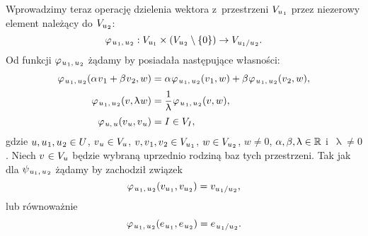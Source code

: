 \documentclass[a4paper,11pt]{article}
\numberwithin{equation}{section}
\renewcommand{\lambda}{\uplambda}
\begin{document}
Wprowadzimy teraz operację dzielenia wektora z~przestrzeni
$V_{ u_{ \hspace{0.05em} 1 } }$ przez niezerowy element należący do
$V_{ u_{ \hspace{0.05em} 2 } }$:
\begin{equation}
  \label{eq:Mechanika-Rozwazania-ogolne-15}
  \varphi_{ \hspace{0.07em} u_{ \hspace{0.05em} 1 }, \, u_{ \hspace{0.05em} 2 } } :
  V_{ u_{ 1 } } \times ( V_{ u_{ \hspace{0.05em} 2 } } \setminus \{ 0 \} ) \to
  V_{ u_{ 1 } / u_{ \hspace{0.05em} 2 } }.
\end{equation}
Od funkcji $\varphi_{ \hspace{0.05em} u_{ \hspace{0.05em} 1 }, \, u_{ \hspace{0.05em} 2 } }$ żądamy
by posiadała następujące własności:
\begin{subequations}
  \begin{align}
    \label{eq:Mechanika-Rozwazania-ogolne-16-A}
    \varphi_{ \HorSpaceTwo u_{ \HorSpaceOne 1 }, \, u_{ \HorSpaceOne 2 } }(
    \alpha \HorSpaceOne v_{ \HorSpaceOne 1 } +
    \beta \HorSpaceOne v_{ \HorSpaceOne 2 }, w )
    &= \alpha \HorSpaceOne \varphi_{ \HorSpaceTwo u_{ \HorSpaceOne 1 }, \,
      u_{ \HorSpaceOne 2 } }( v_{ \HorSpaceOne 1 }, w ) +
      \beta \HorSpaceOne \varphi_{ \HorSpaceTwo u_{ \HorSpaceOne 1 }, \,
      u_{ \HorSpaceOne 2 } }( v_{ \HorSpaceOne 2 }, w ), \\[0.2em]
    \label{eq:Mechanika-Rozwazania-ogolne-16-B}
    \varphi_{ \HorSpaceTwo u_{ \HorSpaceOne 1 }, \, u_{ \HorSpaceOne 2 } }( v,
    \lambda \HorSpaceOne w )
    &= \frac{ 1 }{ \lambda } \HorSpaceOne
      \varphi_{ \HorSpaceTwo u_{ \HorSpaceTwo 1 }, \, u_{ \HorSpaceOne 2 } }( v,
      w ), \\[0.2em]
    \label{eq:Mechanika-Rozwazania-ogolne-16-C}
    \varphi_{ \HorSpaceTwo u, \, u }( v_{ \HorSpaceOne u }, v_{ \HorSpaceOne u } )
    &= I \in V_{ I },
  \end{align}
\end{subequations}
gdzie $u, u_{ \hspace{0.05em} 1 }, u_{ \hspace{0.05em} 2 } \in U$,
$v_{ \hspace{0.05em} u } \in V_{ u }$,
$v, v_{ \hspace{0.05em} 1 }, v_{ \hspace{0.05em} 2 } \in V_{ u_{ \hspace{0.05em} 1 } }$,
$w \in V_{ u_{ \hspace{0.05em} 2 } }$, $w \neq 0$,
$\alpha, \beta, \lambda \in \Rbb$ i~$\lambda \neq 0$. Niech $v_{ \hspace{0.05em} } \in V_{ u }$ będzie
wybraną uprzednio rodziną baz tych przestrzeni. Tak jak dla
$\psi_{ \hspace{0.07em} u_{ 1 }, \, u_{ \hspace{0.07em} 2 }}$ żądamy by zachodził związek
\begin{equation}
  \label{eq:Mechanika-Rozwazania-ogolne-17}
  \varphi_{ \hspace{0.07em} u_{ \hspace{0.05em} 1 }, \, u_{ \hspace{0.05em} 2 } }(
  v_{ u_{ \hspace{0.05em} 1 } },
  v_{ u_{ \hspace{0.05em} 2 } } ) =
  v_{ u_{ \hspace{0.05em} 1 } / u_{ \hspace{0.05em} 2 } },
\end{equation}
lub równoważnie
\begin{equation}
  \label{eq:Mechanika-Rozwazania-ogolne-18}
  \varphi_{ \hspace{0.07em} u_{ \hspace{0.05em} 1 }, \, u_{ \hspace{0.05em} 2 } }(
  e_{ \hspace{0.05em} u_{ \hspace{0.05em} 1 } },
  e_{ \hspace{0.07em} u_{ \hspace{0.05em} 2 } } ) =
  e_{ \hspace{0.07em} u_{ \hspace{0.05em} 1 } / u_{ \hspace{0.05em} 2 } }.
\end{equation}
\end{document}
